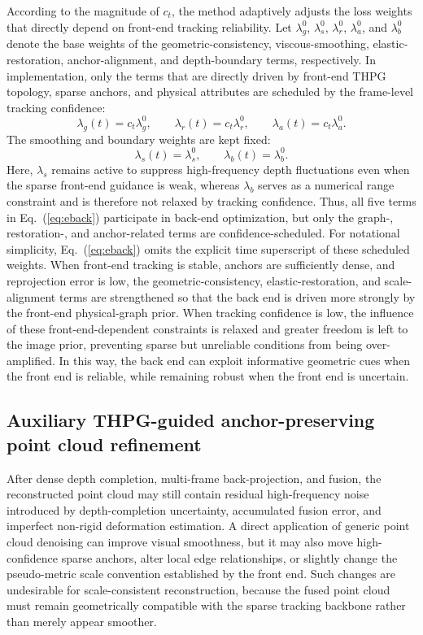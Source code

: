 \documentclass[pdflatex,sn-mathphys-num]{sn-jnl}
\begin{document}
According to the magnitude of $c_t$, the method adaptively adjusts the loss weights that directly depend on front-end tracking reliability. Let $\lambda_g^0$, $\lambda_s^0$, $\lambda_r^0$, $\lambda_a^0$, and $\lambda_b^0$ denote the base weights of the geometric-consistency, viscous-smoothing, elastic-restoration, anchor-alignment, and depth-boundary terms, respectively. In implementation, only the terms that are directly driven by front-end THPG topology, sparse anchors, and physical attributes are scheduled by the frame-level tracking confidence:
\begin{equation}
\lambda_g(t)=c_t\lambda_g^0,\qquad
\lambda_r(t)=c_t\lambda_r^0,\qquad
\lambda_a(t)=c_t\lambda_a^0.
\label{eq:scheduler}
\end{equation}
The smoothing and boundary weights are kept fixed:
\begin{equation}
\lambda_s(t)=\lambda_s^0,\qquad
\lambda_b(t)=\lambda_b^0.
\label{eq:scheduler-fixed}
\end{equation}
Here, $\lambda_s$ remains active to suppress high-frequency depth fluctuations even when the sparse front-end guidance is weak, whereas $\lambda_b$ serves as a numerical range constraint and is therefore not relaxed by tracking confidence. Thus, all five terms in Eq.~(\ref{eq:eback}) participate in back-end optimization, but only the graph-, restoration-, and anchor-related terms are confidence-scheduled. For notational simplicity, Eq.~(\ref{eq:eback}) omits the explicit time superscript of these scheduled weights. When front-end tracking is stable, anchors are sufficiently dense, and reprojection error is low, the geometric-consistency, elastic-restoration, and scale-alignment terms are strengthened so that the back end is driven more strongly by the front-end physical-graph prior. When tracking confidence is low, the influence of these front-end-dependent constraints is relaxed and greater freedom is left to the image prior, preventing sparse but unreliable conditions from being over-amplified. In this way, the back end can exploit informative geometric cues when the front end is reliable, while remaining robust when the front end is uncertain.

\subsection{Auxiliary THPG-guided anchor-preserving point cloud refinement}\label{subsec:postprocess}

After dense depth completion, multi-frame back-projection, and fusion, the reconstructed point cloud may still contain residual high-frequency noise introduced by depth-completion uncertainty, accumulated fusion error, and imperfect non-rigid deformation estimation. A direct application of generic point cloud denoising can improve visual smoothness, but it may also move high-confidence sparse anchors, alter local edge relationships, or slightly change the pseudo-metric scale convention established by the front end. Such changes are undesirable for scale-consistent reconstruction, because the fused point cloud must remain geometrically compatible with the sparse tracking backbone rather than merely appear smoother.
\end{document}
